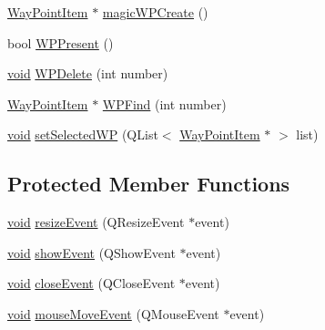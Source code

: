 \begin{DoxyCompactItemize}
\item 
\hyperlink{classmapcontrol_1_1_way_point_item}{\-Way\-Point\-Item} $\ast$ \hyperlink{group___o_p_map_widget_gad4bf26f4b1c6f177513e61bd70956360}{magic\-W\-P\-Create} ()
\item 
bool \hyperlink{group___o_p_map_widget_ga22fc188ce6991cc900182e1a60b3ee34}{\-W\-P\-Present} ()
\item 
\hyperlink{group___u_a_v_objects_plugin_ga444cf2ff3f0ecbe028adce838d373f5c}{void} \hyperlink{group___o_p_map_widget_ga7bea26b184175ee4cf10a9103b59de32}{\-W\-P\-Delete} (int number)
\item 
\hyperlink{classmapcontrol_1_1_way_point_item}{\-Way\-Point\-Item} $\ast$ \hyperlink{group___o_p_map_widget_ga633b72f3ab012b8e9b8f6e58b75bfbb8}{\-W\-P\-Find} (int number)
\item 
\hyperlink{group___u_a_v_objects_plugin_ga444cf2ff3f0ecbe028adce838d373f5c}{void} \hyperlink{group___o_p_map_widget_ga611fd47fbd108d887b40a1d1a878bd27}{set\-Selected\-W\-P} (\-Q\-List$<$ \hyperlink{classmapcontrol_1_1_way_point_item}{\-Way\-Point\-Item} $\ast$ $>$ list)
\end{DoxyCompactItemize}
\subsection*{\-Protected \-Member \-Functions}
\begin{DoxyCompactItemize}
\item 
\hyperlink{group___u_a_v_objects_plugin_ga444cf2ff3f0ecbe028adce838d373f5c}{void} \hyperlink{group___o_p_map_widget_gaeb81f004806916633910751cfe808de8}{resize\-Event} (\-Q\-Resize\-Event $\ast$event)
\item 
\hyperlink{group___u_a_v_objects_plugin_ga444cf2ff3f0ecbe028adce838d373f5c}{void} \hyperlink{group___o_p_map_widget_gaa02db9787da06fe405061620b80605d4}{show\-Event} (\-Q\-Show\-Event $\ast$event)
\item 
\hyperlink{group___u_a_v_objects_plugin_ga444cf2ff3f0ecbe028adce838d373f5c}{void} \hyperlink{group___o_p_map_widget_gabb098a73bed666626144c0da8332c609}{close\-Event} (\-Q\-Close\-Event $\ast$event)
\item 
\hyperlink{group___u_a_v_objects_plugin_ga444cf2ff3f0ecbe028adce838d373f5c}{void} \hyperlink{group___o_p_map_widget_gaac8f40f4fe29d88750285c003b3f7b3f}{mouse\-Move\-Event} (\-Q\-Mouse\-Event $\ast$event)
\end{DoxyCompactItemize}
